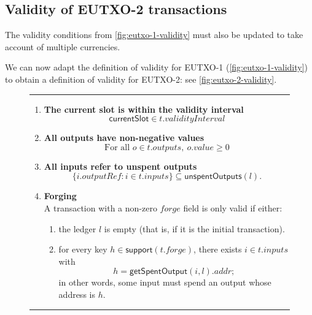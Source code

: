 \documentclass[a4paper]{article}
\renewcommand{\i}{\textit}  %
\newcommand{\msf}[1]{\ensuremath{\mathsf{#1}}}
\newcommand{\mi}[1]{\ensuremath{\mathit{#1}}}
\newcommand\rfskip{7pt}
\newenvironment{ruledfigure}[1]{\begin{figure}[#1]\hrule\vspace{\rfskip}}{\vspace{\rfskip}\hrule\end{figure}}
\newcommand{\support}{\msf{support}}
\newcommand{\inputs}{\mi{inputs}}
\newcommand{\outputs}{\mi{outputs}}
\newcommand{\forge}{\mi{forge}}
\newcommand{\addr}{\mi{addr}}
\newcommand{\val}{\mi{value}}  %
\newcommand{\outputref}{\mi{outputRef}}
\newcommand{\getSpent}{\msf{getSpentOutput}}
\newcommand{\unspent}{\msf{unspentOutputs}}
\begin{document}
\subsection{Validity of EUTXO-2 transactions}
\label{sec:eutxo-2-validity}

\bigskip
\noindent The validity conditions from
\cref{fig:eutxo-1-validity} must also be updated to take account
of multiple currencies.

We can now adapt the definition of validity for EUTXO-1
(\cref{fig:eutxo-1-validity}) to obtain a definition of validity for
EUTXO-2: see \cref{fig:eutxo-2-validity}.

\begin{ruledfigure}{H}
\begin{enumerate}

\item
  \label{rule:slot-in-range-2}
  \textbf{The current slot is within the validity interval}
  \begin{displaymath}
    \msf{currentSlot} \in t.\i{validityInterval}
  \end{displaymath}

\item
  \label{rule:all-outputs-are-non-negative-2}
  \textbf{All outputs have non-negative values}
  \begin{displaymath}
    \textrm{For all } o \in t.\outputs,\ o.\val \geq 0
  \end{displaymath}

\item
  \label{rule:all-inputs-refer-to-unspent-outputs-2}
  \textbf{All inputs refer to unspent outputs}
  \begin{displaymath}
    \{i.\outputref: i \in t.\inputs \} \subseteq \unspent(l).
  \end{displaymath}

\item
  \label{rule:forging-2}
  \textbf{Forging}\\
  A transaction with a non-zero \forge{} field is only
  valid if either:
  \begin{enumerate}
    \item the ledger $l$ is empty (that is, if it is the initial transaction).
    \item \label{rule:custom-forge}
      for every key $h \in \support(t.\forge)$, there
      exists $i \in t.\inputs$ with
      $$
      h = \getSpent(i,l).\addr;
      $$
      in other words, some input must spend an output
      whose address is $h$.
  \end{enumerate}


\end{enumerate}
\end{ruledfigure}
\end{document}
